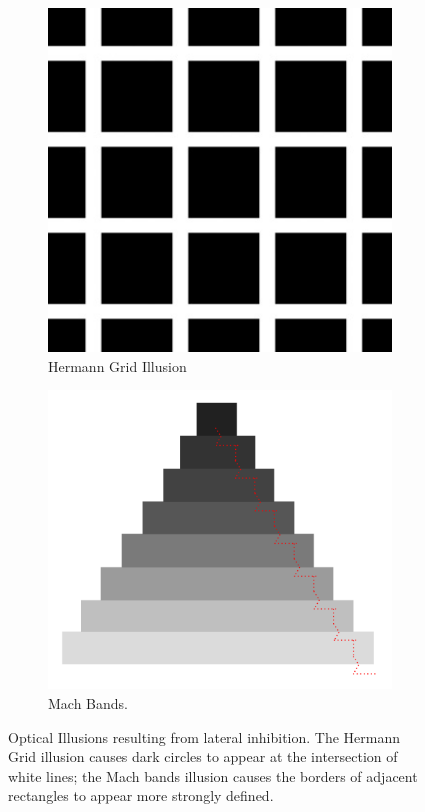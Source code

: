 \documentclass[11pt]{isuthesis}\usepackage[]{graphicx}\usepackage[]{color}
\begin{document}
\begin{figure}
\centering
\begin{subfigure}[b]{.45\textwidth}
  \centering
  \includegraphics[width=\textwidth]{HermannGrid}
  \caption{\small Hermann Grid Illusion \label{fig:hermanngrid}}
\end{subfigure}\hfill
\begin{subfigure}[b]{.45\textwidth}
  \centering
  \includegraphics[width=\textwidth]{MachBands}
  \caption{\small Mach Bands. 
  \label{fig:machbands}}
\end{subfigure}
\caption[Inhibition Illusions]{Optical Illusions resulting from lateral inhibition. The Hermann Grid illusion causes dark circles to appear at the intersection of white lines; the Mach bands illusion causes the borders of adjacent rectangles to appear more strongly defined.} \label{fig:InhibitionIllusions}
\end{figure}
\end{document}
